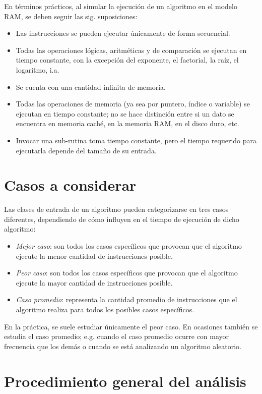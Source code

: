 En términos prácticos, al simular la ejecución de un algoritmo en
el modelo RAM, se deben seguir las sig. suposiciones:
\begin{itemize}
\item Las instrucciones se pueden ejecutar únicamente de forma secuencial. 
\item Todas las operaciones lógicas, aritméticas y de comparación se ejecutan
en tiempo constante, con la excepción del exponente, el factorial,
la raíz, el logaritmo, i.a.
\item Se cuenta con una cantidad infinita de memoria. 
\item Todas las operaciones de memoria (ya sea por puntero, índice o variable)
se ejecutan en tiempo constante; no se hace distinción entre si un
dato se encuentra en memoria caché, en la memoria RAM, en el disco
duro, etc. 
\item Invocar una sub-rutina toma tiempo constante, pero el tiempo requerido
para ejecutarla depende del tamaño de su entrada.
\end{itemize}

\section{Casos a considerar}

Las clases de entrada de un algoritmo pueden categorizarse en tres
casos diferentes, dependiendo de cómo influyen en el tiempo de ejecución
de dicho algoritmo:
\begin{itemize}
\item \emph{Mejor caso}: son todos los casos específicos que provocan que
el algoritmo ejecute la menor cantidad de instrucciones posible. 
\item \emph{Peor caso}: son todos los casos específicos que provocan que
el algoritmo ejecute la mayor cantidad de instrucciones posible. 
\item \emph{Caso promedio}: representa la cantidad promedio de instrucciones
que el algoritmo realiza para todos los posibles casos específicos. 
\end{itemize}
En la práctica, se suele estudiar únicamente el peor caso. En ocasiones
también se estudia el caso promedio; e.g. cuando el caso promedio
ocurre con mayor frecuencia que los demás o cuando se está analizando
un algoritmo aleatorio. 

\section{Procedimiento general del análisis}

